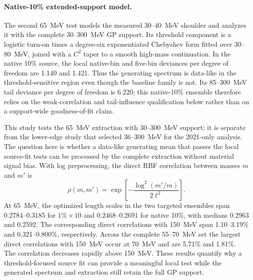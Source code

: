 \paragraph{Native-10\% extended-support model.}
The second 65~MeV test models the measured 30--40~MeV shoulder and analyzes it with
the complete 30--300~MeV GP support.  Its threshold component is a logistic turn-on
times a degree-six exponentiated Chebyshev form fitted over 30--80~MeV, joined with a
$C^2$ taper to a smooth high-mass continuation. In the native 10\% source, the local
native-bin and five-bin deviances per degree of freedom are 1.140 and 1.421.  Thus the
generating spectrum is data-like in the threshold-sensitive region even though the
baseline family is not. Its 85--300~MeV tail deviance per degree of freedom
is 6.220; this native-10\% ensemble therefore relies on the weak-correlation and
tail-influence qualification below rather than on a support-wide goodness-of-fit
claim.

This study tests the 65~MeV extraction with 30--300~MeV support; it is separate from
the lower-edge study that selected 36--300~MeV for the 2021-only analysis. The question
here is whether a data-like generating mean that passes the local
source-fit tests can be processed by the complete extraction without material signal
bias.  With log preprocessing, the direct RBF correlation between masses $m$ and
$m'$ is
\begin{equation}
 \rho(m,m')=\exp\!\left[-\frac{\log^2(m'/m)}{2\ell^2}\right].
\end{equation}
At 65~MeV, the optimized length scales in the two targeted
ensembles span 0.2784--0.3185 for $1\%\times10$ and 0.2468--0.2691 for native
10\%, with medians 0.2963 and 0.2592.  The corresponding direct correlations with
150~MeV span 1.10--3.19\% and 0.321--0.800\%, respectively.  Across the complete
55--70~MeV set the largest direct correlations with 150~MeV occur at 70~MeV and are
5.71\% and 1.81\%.  The correlation decreases rapidly above 150~MeV.  These results quantify why a
threshold-focused source fit can provide a meaningful local test while the generated
spectrum and extraction still retain the full GP support.

